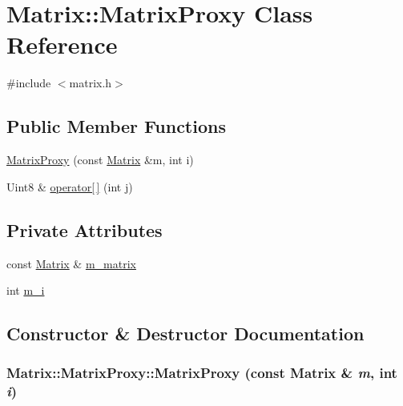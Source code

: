 \hypertarget{classMatrix_1_1MatrixProxy}{
\section{Matrix::MatrixProxy Class Reference}
\label{classMatrix_1_1MatrixProxy}
}


{\ttfamily \#include $<$matrix.h$>$}

\subsection*{Public Member Functions}
\begin{DoxyCompactItemize}
\item 
\hyperlink{classMatrix_1_1MatrixProxy_a109448ff7daca406e870ce2e2be8731c}{MatrixProxy} (const \hyperlink{classMatrix}{Matrix} \&m, int i)
\item 
Uint8 \& \hyperlink{classMatrix_1_1MatrixProxy_a2ed980ec3430586562e32af3151ad82b}{operator\mbox{[}$\,$\mbox{]}} (int j)
\end{DoxyCompactItemize}
\subsection*{Private Attributes}
\begin{DoxyCompactItemize}
\item 
const \hyperlink{classMatrix}{Matrix} \& \hyperlink{classMatrix_1_1MatrixProxy_a39060e70408df9c6b279340decf6f2c7}{m\_\-matrix}
\item 
int \hyperlink{classMatrix_1_1MatrixProxy_ab9582d03e8e1bbb6f03473691f01330f}{m\_\-i}
\end{DoxyCompactItemize}


\subsection{Constructor \& Destructor Documentation}
\hypertarget{classMatrix_1_1MatrixProxy_a109448ff7daca406e870ce2e2be8731c}{
\subsubsection[{MatrixProxy}]{\setlength{\rightskip}{0pt plus 5cm}Matrix::MatrixProxy::MatrixProxy (const {\bf Matrix} \& {\em m}, \/  int {\em i})}}
\label{classMatrix_1_1MatrixProxy_a109448ff7daca406e870ce2e2be8731c}

